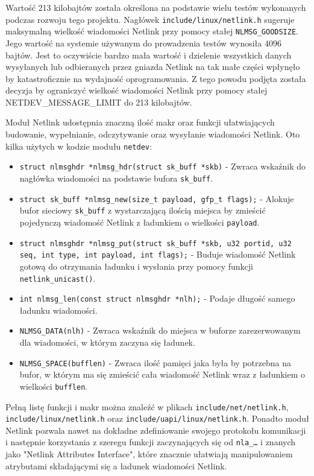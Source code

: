 \documentclass[10pt]{article}
\begin{document}
Wartość 213 kilobajtów została określona na podstawie wielu testów wykonanych podczas rozwoju tego projektu. Nagłówek \texttt{include/linux/netlink.h} sugeruje maksymalną wielkość wiadomości Netlink przy pomocy stałej \texttt{NLMSG\_GOODSIZE}. Jego wartość na systemie używanym do prowadzenia testów wynosiła 4096 bajtów. Jest to oczywiście bardzo mała wartość i dzielenie wszystkich danych wysyłanych lub odbieranych przez gniazda Netlink na tak małe części wpłynęło by katastroficznie na wydajność oprogramowania. Z tego powodu podjęta została decyzja by ograniczyć wielkość wiadomości Netlink przy pomocy stałej NETDEV\_MESSAGE\_LIMIT do 213 kilobajtów.

Moduł Netlink udostępnia znaczną ilość makr oraz funkcji ułatwiających budowanie, wypełnianie, odczytywanie oraz wysyłanie wiadomości Netlink.  Oto kilka użytych w kodzie modułu \texttt{netdev}:

\begin{itemize}
\itemsep1pt\parskip0pt
\item
  \texttt{struct nlmsghdr *nlmsg\_hdr(struct sk\_buff *skb)} - Zwraca wskaźnik do nagłówka wiadomości na podstawie bufora \texttt{sk\_buff}.
\item
  \texttt{struct sk\_buff *nlmsg\_new(size\_t payload, gfp\_t flags);} - Alokuje bufor sieciowy \texttt{sk\_buff} z wystarczającą ilością miejsca by zmieścić pojedynczą wiadomość Netlink z ładunkiem o wielkości \texttt{payload}.
\item
  \texttt{struct nlmsghdr *nlmsg\_put(struct sk\_buff *skb, u32 portid, u32 seq, int type, int payload, int flags);} - Buduje wiadomość Netlink gotową do otrzymania ładunku i wysłania przy pomocy funkcji \texttt{netlink\_unicast()}.
\item
  \texttt{int nlmsg\_len(const struct nlmsghdr *nlh);} - Podaje długość samego ładunku wiadomości.
\item
  \texttt{NLMSG\_DATA(nlh)} - Zwraca wskaźnik do miejsca w buforze zarezerwowanym dla wiadomości, w którym zaczyna się ładunek.
\item
  \texttt{NLMSG\_SPACE(bufflen)} - Zwraca ilość pamięci jaka była by potrzebna na bufor, w którym ma się zmieścić cała wiadomość Netlink wraz z ładunkiem o wielkości \texttt{bufflen}.
\end{itemize}

Pełną listę funkcji i makr można znaleźć w plikach \texttt{include/net/netlink.h}, \texttt{include/linux/netlink.h} oraz \texttt{include/uapi/linux/netlink.h}. Ponadto moduł Netlink pozwala nawet na dokładne zdefiniowanie swojego protokołu komunikacji i następnie korzystania z szeregu funkcji zaczynających się od \texttt{nla\_\ldots} i znanych jako "Netlink Attributes Interface", które znacznie ułatwiają manipulowaniem atrybutami składającymi się a ładunek wiadomości Netlink.
\end{document}
